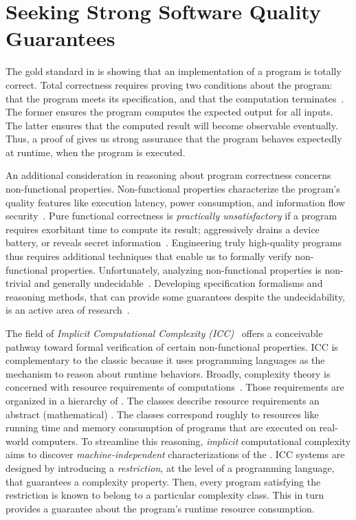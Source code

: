 \section{Seeking Strong Software Quality Guarantees}
\label{sec:aicc-intro}

The gold standard in  is showing that an implementation
of a program is {totally correct}. Total correctness
requires proving two conditions about the program: that the program meets its
specification, and that the computation
terminates~\cite{leino2023}. The former ensures the program computes the
expected output for all inputs. The latter ensures that the computed result will
become observable {eventually}. Thus, a proof of  gives
us strong assurance that the program behaves expectedly at runtime, \ie when the
program is executed.

An additional consideration in reasoning about program correctness concerns
{non-functional} properties. Non-functional
properties characterize the program's quality features like execution latency,
power consumption, and information flow security~\cite{terbeek2018}. Pure
functional correctness is \emph{practically unsatisfactory} if a program
requires exorbitant time to compute its result; aggressively drains a device
battery, or reveals secret information~\cite{heraud2011,aubert20222}.
Engineering truly high-quality programs thus requires additional techniques that
enable us to formally verify non-functional properties. Unfortunately, analyzing
non-functional properties is non-trivial and generally
undecidable~\cite{rice1953}. Developing specification
formalisms and reasoning methods, that can provide some guarantees despite the
undecidability, is an active area of research~\cite{etaps2025}.

The field of \emph{Implicit Computational Complexity (ICC)}~\cite{dallago2011}
offers a conceivable pathway toward formal verification of certain
non-functional properties. ICC is complementary to the classic  because it uses programming languages as the {mechanism} to reason about
runtime behaviors. Broadly, complexity theory is concerned with resource
requirements of computations~\cite{goldreich2008}. Those requirements are
organized in a hierarchy of . The classes describe
resource requirements \wrt an abstract (mathematical) . The
classes correspond roughly to resources like running time and memory consumption
of programs that are executed on real-world computers. To streamline this
reasoning, \emph{implicit} computational complexity aims to discover
\emph{machine-independent} characterizations of the .
ICC systems are designed by introducing a \emph{restriction}, at the level of a
programming language, that guarantees a complexity property. Then, every program
satisfying the restriction is known to belong to a particular complexity class.
This in turn provides a guarantee about the program's runtime resource
consumption.

